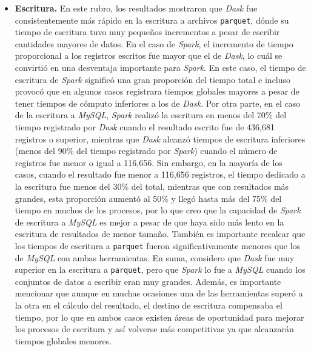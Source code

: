 \begin{itemize}
	\item \textbf{Escritura.} En este rubro, los resultados mostraron que \textit{Dask} fue consistentemente más rápido en la escritura a archivos \texttt{parquet}, dónde su tiempo de escritura tuvo muy pequeños incrementos a pesar de escribir cantidades mayores de datos. En el caso de \textit{Spark}, el incremento de tiempo proporcional a los registros escritos fue mayor que el de \textit{Dask}, lo cuál se convirtió en una desventaja importante para \textit{Spark}. En este caso, el tiempo de escritura de \textit{Spark} significó una gran proporción del tiempo total e incluso provocó que  en algunos casos registrara tiempos globales mayores a pesar de tener tiempos de cómputo inferiores a los de \textit{Dask}. Por otra parte, en el caso de la escritura a \textit{MySQL}, \textit{Spark} realizó la escritura en menos del 70\% del tiempo registrado por \textit{Dask} cuando el resultado escrito fue de 436,681 registros o superior, mientras que \textit{Dask} alcanzó tiempos de escritura inferiores (menos del 90\% del tiempo registrado por \textit{Spark}) cuando el número de registros fue menor o igual a 116,656. Sin embargo, en la mayoría de los casos, cuando el resultado fue menor a 116,656 registros, el tiempo dedicado a la escritura fue menos del 30\% del total, mientras que con resultados más grandes, esta proporción aumentó al 50\% y llegó hasta más del 75\% del tiempo en muchos de los procesos, por lo que creo que la capacidad de \textit{Spark} de escritura a \textit{MySQL} es mejor a pesar de que haya sido más lento en la escritura de resultados de menor tamaño. También es importante recalcar que los tiempos de escritura a \texttt{parquet} fueron significativamente menores que los de \textit{MySQL} con ambas herramientas. En suma, considero que \textit{Dask} fue muy superior en la escritura a \texttt{parquet}, pero que \textit{Spark} lo fue a \textit{MySQL} cuando los conjuntos de datos a escribir eran muy grandes. Además, es importante mencionar que aunque en muchas ocasiones una de las herramientas superó a la otra en el cálculo del resultado, el destino de escritura compensaba el tiempo, por lo que en ambos casos existen áreas de oportunidad para mejorar los procesos de escritura y así volverse más competitivas ya que alcanzarán tiempos globales menores. 
		

\end{itemize}
